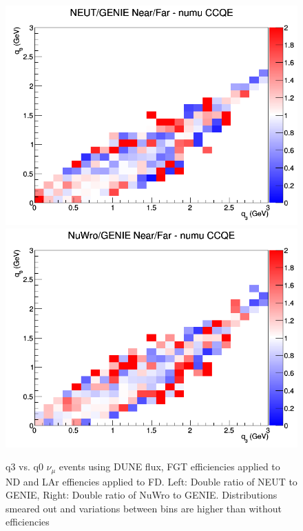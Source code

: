 \documentclass[12pt]{article}
\begin{document}
\begin{figure}[h]
\centering
{}
\includegraphics[width=\linewidth]{eff_q0_q3/FGT/ratios/CCQE_NEUT_GENIE_numu_NF_q3_q0.png}
\endminipage
{}
\includegraphics[width=\linewidth]{eff_q0_q3/FGT/ratios/CCQE_NuWro_GENIE_numu_NF_q3_q0.png}
\endminipage
\caption{q3 vs. q0 $\nu_{\mu}$ events using DUNE flux, FGT efficiencies applied to ND and LAr effiencies applied to FD. Left: Double ratio of NEUT to GENIE, Right: Double ratio of NuWro to GENIE. Distributions smeared out and variations between bins are higher than without efficiencies}
\label{fig:q0q3_numu_CCQE_FGT_eff}
\end{figure}
\FloatBarrier
\end{document}
